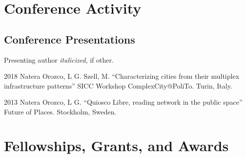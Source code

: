 \documentclass{academiccv}
\begin{document}
\section*{Conference Activity}


	
	


	


\subsection*{Conference Presentations}

Presenting author \textit{italicized}, if other.\bigskip

\begin{tablist}

\item[2018] \tab Natera Orozco, L G. Szell, M. \enquote{Characterizing cities from their multiplex infrastructure patterns} SICC Workshop ComplexCity@PoliTo. Turin, Italy.

\item[2013] \tab Natera Orozco, L G. \enquote{Quiosco Libre, reading network in the public space} Future of Places. Stockholm, Sweden.

\end{tablist}



\section*{Fellowships, Grants, and Awards}
\end{document}
